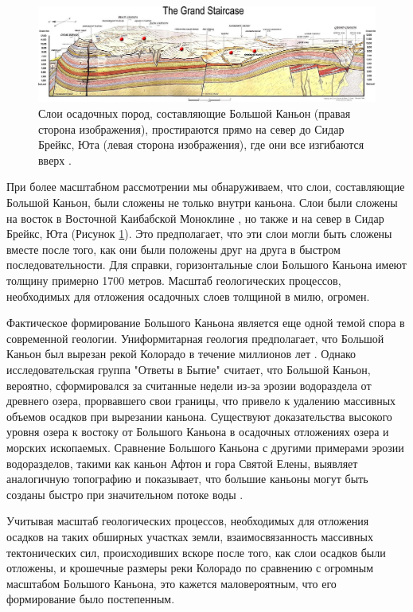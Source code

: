 \documentclass[10pt,twocolumn,letterpaper]{article}
\begin{document}
\begin{figure}
\begin{center}
\includegraphics[width=1\textwidth]{Grand_Staircase-big.jpg}
\end{center}
   \caption{Слои осадочных пород, составляющие Большой Каньон (правая сторона изображения), простираются прямо на север до Сидар Брейкс, Юта (левая сторона изображения), где они все изгибаются вверх \cite{50}.}
\label{fig:4}
\end{figure}

При более масштабном рассмотрении мы обнаруживаем, что слои, составляющие Большой Каньон, были сложены не только внутри каньона. Слои были сложены на восток в Восточной Каибабской Моноклине \cite{46}, но также и на север в Сидар Брейкс, Юта (Рисунок \ref{fig:4}). Это предполагает, что эти слои могли быть сложены вместе после того, как они были положены друг на друга в быстром последовательности. Для справки, горизонтальные слои Большого Каньона имеют толщину примерно 1700 метров. Масштаб геологических процессов, необходимых для отложения осадочных слоев толщиной в милю, огромен.

Фактическое формирование Большого Каньона является еще одной темой спора в современной геологии. Униформитарная геология предполагает, что Большой Каньон был вырезан рекой Колорадо в течение миллионов лет \cite{47}. Однако исследовательская группа "Ответы в Бытие" считает, что Большой Каньон, вероятно, сформировался за считанные недели из-за эрозии водораздела от древнего озера, прорвавшего свои границы, что привело к удалению массивных объемов осадков при вырезании каньона. Существуют доказательства высокого уровня озера к востоку от Большого Каньона в осадочных отложениях озера и морских ископаемых. Сравнение Большого Каньона с другими примерами эрозии водоразделов, такими как каньон Афтон и гора Святой Елены, выявляет аналогичную топографию и показывает, что большие каньоны могут быть созданы быстро при значительном потоке воды \cite{48}.

Учитывая масштаб геологических процессов, необходимых для отложения осадков на таких обширных участках земли, взаимосвязанность массивных тектонических сил, происходивших вскоре после того, как слои осадков были отложены, и крошечные размеры реки Колорадо по сравнению с огромным масштабом Большого Каньона, это кажется маловероятным, что его формирование было постепенным.
\end{document}
